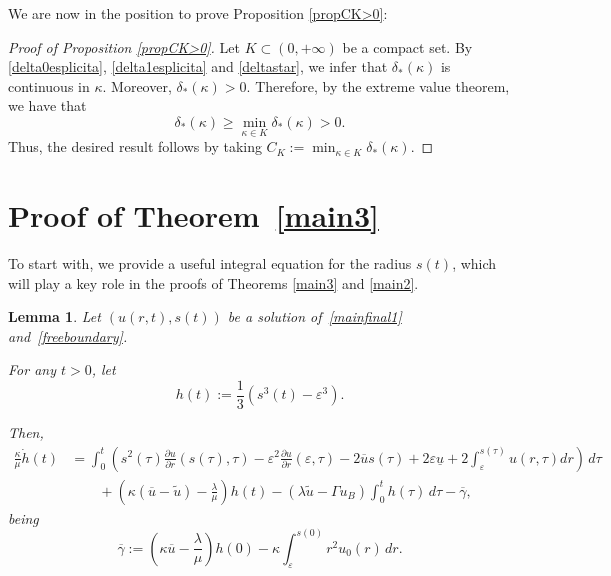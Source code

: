 \documentclass[12pt,a4paper,intlimits,sumlimits]{amsart}
\theoremstyle{definition}
\theoremstyle{plain}
\newtheorem{lemma}[definition]{Lemma}
\numberwithin{equation}{section}
\renewcommand{\ge}{\geqslant}
\begin{document}
We are now in the position to prove Proposition \ref{propCK>0}:
\begin{proof}[Proof of Proposition \ref{propCK>0}]
Let $K\subset (0, +\infty)$ be a compact set.
By \eqref{delta0esplicita}, \eqref{delta1esplicita} and \eqref{deltastar}, we infer that $\delta_*(\kappa)$ is continuous in $\kappa$. Moreover,  $\delta_*(\kappa)>0$.
Therefore, by the extreme value theorem,  we have that
\[
\delta_*(\kappa)\ge \min_{\kappa\in K} \delta_*(\kappa)>0.
\]
Thus, the desired result follows by taking $C_K:=\min_{\kappa\in K} \delta_*(\kappa)$.
\end{proof}

\section{Proof of Theorem~\ref{main3}}\label{èlpkmojbhugvyufctydrstetdryftgyhu}
To start with, we provide a useful integral equation for the radius $s(t)$, which will play a key role in the proofs of Theorems \ref{main3} and \ref{main2}.

\begin{lemma}\label{lpèkoijhugyvftcdrxsedctfvygbhjnkm}
Let $(u(r,t), s(t))$ be a solution of~\eqref{mainfinal1} and~\eqref{freeboundary}. 

For any $t>0$,  let
\begin{equation}\label{hdefn}
h(t):=\frac13 (s^3(t)-\varepsilon^3).
\end{equation}

Then,
\begin{equation}\label{dctfuvygibuhonijpmko,}
\begin{split}
\frac{\kappa}{\mu}\dot h(t)&=\int_0^t\left(s^2(\tau)\frac{\partial u}{\partial r}(s(\tau),\tau)-\varepsilon^2\frac{\partial u}{\partial r}(\varepsilon,\tau)-2\overline{u}s(\tau)+2\varepsilon \underline{u} +2\int_\varepsilon^{s(\tau)}u(r,\tau)dr\right) \,d\tau \\
&\qquad +\left(\kappa(\overline{u}-\widetilde u)-\frac{\lambda}{\mu}\right)h(t)-(\lambda\widetilde u -\Gamma u_B) \int_0^t h(\tau)\,d\tau-\overline\gamma,
\end{split}
\end{equation}
being
\begin{equation}\label{overgammadefn}
\overline\gamma:=\left(\kappa \overline{u}-\frac{\lambda}{\mu}\right)h(0)-\kappa\int_\varepsilon^{s(0)}r^2u_0(r)\,dr.
\end{equation}
\end{lemma}
\end{document}
